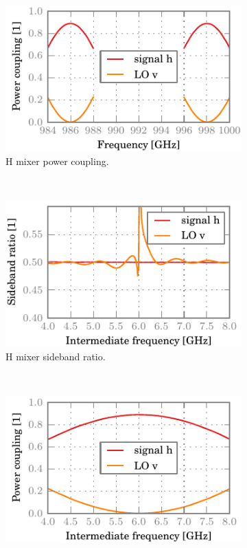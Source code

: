 \begin{figure}[hbtp]
    \centering
    \begin{subfigure}[b]{.5\textwidth}
        \includegraphics{chapter_3/06_tighter_h_dsb}%
        \caption{H mixer power coupling.}
    \end{subfigure}%
    \\
    \begin{subfigure}[b]{.5\textwidth}
        \includegraphics{chapter_3/06_tighter_h_sbr}%
        \caption{H mixer sideband ratio.}
    \end{subfigure}%
    \\
    \begin{subfigure}[b]{.5\textwidth}
        \includegraphics{chapter_3/06_tighter_h_ssb}%

\end{subfigure}
\end{figure}
